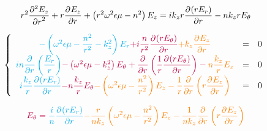 \begin{equation}
r^2 \ddr[2]{r}{E_z} + r\ddr{r}{E_z} + \left(r^2\w^2\eps\mu - n^2\right)E_z =ik_zr\ddr{r}{(rE_r)} -  nk_zrE_\theta
\end{equation}


\begin{equation}
    \left\lbrace
    \begin{array}{ccc}
        \color{cyan}{-\left(\w^2\eps\mu -\frac{n^2}{r^2}  - k_z^2\right)E_r}  \color{purple}{+i\frac{n}{r^2}\ddr{r}{(rE_\theta)}}  \color{orange}{+k_z\ddr{r}{E_z}} & = & 0
        \\
        \color{cyan}{in\ddr{r}{}\left(\frac{E_r}{r}\right)} \color{purple}{-\left(\w^2\eps\mu - k_z^2\right)E_\theta + \ddr{r}{}\left(\frac{1}{r}\ddr{r}{(rE_\theta)}\right)}  - \color{orange}{n\frac{k_z}{r}E_z} & = & 0
        \\
        \color{cyan}{i\frac{k_z}{r}\ddr{r}{(rE_r)}}  \color{purple}{- n\frac{k_z}{r}E_\theta}  \color{orange}{-\left(\w^2\eps\mu - \frac{n^2}{r^2} \right)E_z - \frac{1}{r}\ddr{r}{}\left(r\ddr{r}{E_z}\right)} & = & 0
    \end{array}
    \right.
\end{equation}

\begin{equation}
       \color{purple}{E_\theta} = \color{cyan}{\frac{i}{n}\ddr{r}{(rE_r)}}  \color{orange}{-\frac{r}{nk_z}\left(\w^2\eps\mu - \frac{n^2}{r^2} \right)E_z - \frac{1}{nk_z}\ddr{r}{}\left(r\ddr{r}{E_z}\right)}
\end{equation}
